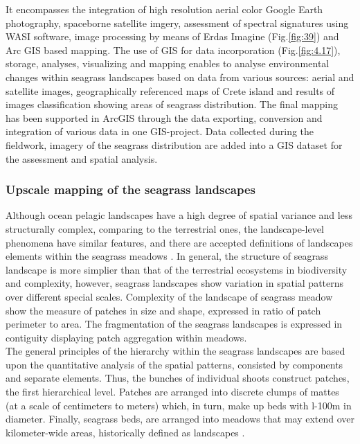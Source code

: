 \documentclass[10pt, a4paper]{article}
\begin{document}
It encompasses the integration of
high resolution aerial color Google Earth photography, spaceborne satellite imgery, assessment of
spectral signatures using WASI software, image processing by means of Erdas Imagine (Fig.\ref{fig:39}) and Arc GIS
based mapping. The use of GIS for data incorporation (Fig.\ref{fig:4.17}), storage, analyses, visualizing and mapping
enables to analyse environmental changes within seagrass landscapes based on data from various
sources: aerial and satellite images, geographically referenced maps of Crete island and results of
images classification showing areas of seagrass distribution.
The final mapping has been supported in ArcGIS through the data exporting, conversion and
integration of various data in one GIS-project. Data collected during the fieldwork, imagery
of the seagrass distribution are added into a GIS dataset for the assessment and spatial analysis.

\subsubsection{Upscale mapping of the seagrass landscapes}
Although ocean pelagic landscapes have a high degree of spatial variance and less structurally
complex, comparing to the terrestrial ones, the landscape-level phenomena have similar features, and
there are accepted definitions of landscapes elements within the seagrass meadows \cite{Robbins94}\label{Robbins94}. 
In general, the structure of seagrass landscape is more simplier than that of the terrestrial
ecosystems in biodiversity and complexity, however, seagrass landscapes show variation in spatial
patterns over different special scales. Complexity of the landscape of seagrass meadow show the
measure of patches in size and shape, expressed in ratio of patch perimeter to area. The fragmentation
of the seagrass landscapes is expressed in contiguity displaying patch aggregation within meadows.\\
The general principles of the hierarchy within the seagrass landscapes are based upon the quantitative
analysis of the spatial patterns, consisted by components and separate elements. Thus, the bunches of
individual shoots construct patches, the first hierarchical level. Patches are arranged into discrete
clumps of mattes (at a scale of centimeters to meters) which, in turn, make up beds with l-100m in
diameter. Finally, seagrass beds, are arranged into meadows that may extend over kilometer-wide
areas, historically defined as landscapes \cite{Robbins94}\label{Robbins94}.
\end{document}
